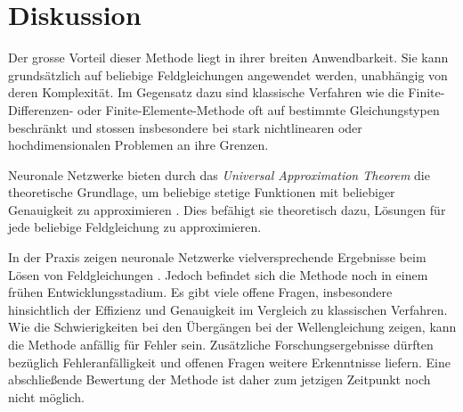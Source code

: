 %
%
%
%

\section{Diskussion}\label{neuronal:section:diskussion}

Der grosse Vorteil dieser Methode liegt in ihrer breiten Anwendbarkeit.
Sie kann grundsätzlich auf beliebige Feldgleichungen angewendet werden, unabhängig von deren Komplexität.
Im Gegensatz dazu sind klassische Verfahren wie die Finite-Differenzen- oder Finite-Elemente-Methode oft auf bestimmte Gleichungstypen beschränkt und stossen insbesondere bei stark nichtlinearen oder hochdimensionalen Problemen an ihre Grenzen.

Neuronale Netzwerke bieten durch das \emph{Universal Approximation Theorem} die theoretische Grundlage, um beliebige stetige Funktionen mit beliebiger Genauigkeit zu approximieren \cite{neuronal:universal_approximation_theorem}.
Dies befähigt sie theoretisch dazu, Lösungen für jede beliebige Feldgleichung zu approximieren.

In der Praxis zeigen neuronale Netzwerke vielversprechende Ergebnisse beim Lösen von Feldgleichungen \cite{neuronal:pinns}.
Jedoch befindet sich die Methode noch in einem frühen Entwicklungsstadium.
Es gibt viele offene Fragen, insbesondere hinsichtlich der Effizienz und Genauigkeit im Vergleich zu klassischen Verfahren.
Wie die Schwierigkeiten bei den Übergängen bei der Wellengleichung zeigen, kann die Methode anfällig für Fehler sein.
Zusätzliche Forschungsergebnisse dürften bezüglich Fehleranfälligkeit und offenen Fragen weitere Erkenntnisse liefern.
Eine abschließende Bewertung der Methode ist daher zum jetzigen Zeitpunkt noch nicht möglich.
